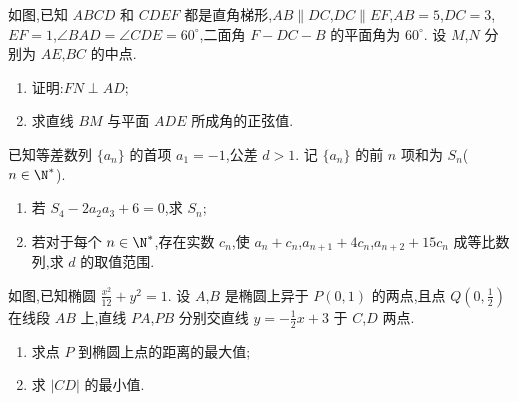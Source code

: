\begin{problem}
如图,已知 \(ABCD\) 和 \(CDEF\) 都是直角梯形,\(AB\parallel DC\),\(DC\parallel EF\),\(AB=5\),\(DC=3\),\(EF=1\),\(\angle BAD=\angle CDE=60^\circ\),二面角 \(F-DC-B\) 的平面角为 \(60^\circ\). 设 \(M\),\(N\) 分别为 \(AE\),\(BC\) 的中点.

\begin{enumerate}
\item 证明:\(FN\perp AD\);

\item 求直线 \(BM\) 与平面 \(ADE\) 所成角的正弦值.
\end{enumerate}

\end{problem}

\begin{problem}
已知等差数列 \(\{a_n\}\) 的首项 \(a_1=-1\),公差 \(d>1\). 记 \(\{a_n\}\) 的前 \(n\) 项和为 \(S_n\)(\(n\in\N^*\)).

\begin{enumerate}
\item 若 \(S_4-2a_2a_3+6=0\),求 \(S_n\);

\item 若对于每个 \(n\in\N^*\),存在实数 \(c_n\),使 \(a_n+c_n\),\(a_{n+1}+4c_n\),\(a_{n+2}+15c_n\) 成等比数列,求 \(d\) 的取值范围.
\end{enumerate}
\end{problem}

\begin{problem}
如图,已知椭圆 \(\frac{x^2}{12}+y^2=1\). 设 \(A\),\(B\) 是椭圆上异于 \(P(0,1)\) 的两点,且点 \(Q\left(0,\frac12\right)\) 在线段 \(AB\) 上,直线 \(PA\),\(PB\) 分别交直线 \(y=-\frac12x+3\) 于 \(C\),\(D\) 两点.

\begin{enumerate}
\item 求点 \(P\) 到椭圆上点的距离的最大值;

\item 求 \(|CD|\) 的最小值.
\end{enumerate}

\end{problem}


